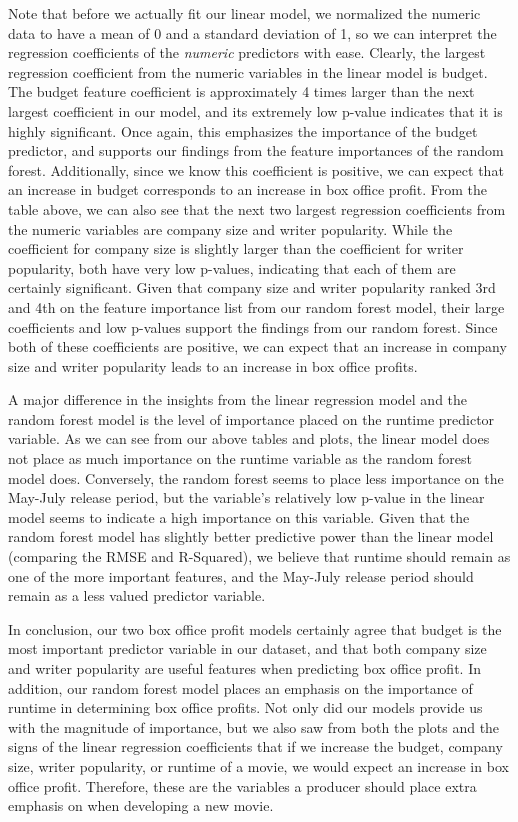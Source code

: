 \documentclass[10pt]{article}
\begin{document}
Note that before we actually fit our linear model, we normalized the numeric data to have a mean of 0 and a standard deviation of 1, so we can interpret the regression coefficients of the \textit{numeric} predictors with ease. Clearly, the largest regression coefficient from the numeric variables in the linear model is budget. The budget feature coefficient is approximately 4 times larger than the next largest coefficient in our model, and its extremely low p-value indicates that it is highly significant. Once again, this emphasizes the importance of the budget predictor, and supports our findings from the feature importances of the random forest. Additionally, since we know this coefficient is positive, we can expect that an increase in budget corresponds to an increase in box office profit. From the table above, we can also see that the next two largest regression coefficients from the numeric variables are company size and writer popularity. While the coefficient for company size is slightly larger than the coefficient for writer popularity, both have very low p-values, indicating that each of them are certainly significant. Given that company size and writer popularity ranked 3rd and 4th on the feature importance list from our random forest model, their large coefficients and low p-values support the findings from our random forest. Since both of these coefficients are positive, we can expect that an increase in company size and writer popularity leads to an increase in box office profits. 

A major difference in the insights from the linear regression model and the random forest model is the level of importance placed on the runtime predictor variable. As we can see from our above tables and plots, the linear model does not place as much importance on the runtime variable as the random forest model does. Conversely, the random forest seems to place less importance on the May-July release period, but the variable’s relatively low p-value in the linear model seems to indicate a high importance on this variable. Given that the random forest model has slightly better predictive power than the linear model (comparing the RMSE and R-Squared), we believe that runtime should remain as one of the more important features, and the May-July release period should remain as a less valued predictor variable. 

In conclusion, our two box office profit models certainly agree that budget is the most important predictor variable in our dataset, and that both company size and writer popularity are useful features when predicting box office profit. In addition, our random forest model places an emphasis on the importance of runtime in determining box office profits. Not only did our models provide us with the magnitude of importance, but we also saw from both the plots and the signs of the linear regression coefficients that if we increase the budget, company size, writer popularity, or runtime of a movie, we would expect an increase in box office profit. Therefore, these are the variables a producer should place extra emphasis on when developing a new movie. 
\end{document}
